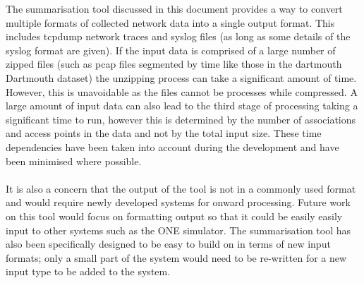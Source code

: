 The summarisation tool discussed in this document provides a way to convert multiple formats of collected network data into a single output format. This includes tcpdump network traces and syslog files (as long as some details of the syslog format are given).
If the input data is comprised of a large number of zipped files (such as pcap files segmented by time like those in the dartmouth Dartmouth dataset) the unzipping process can take a significant amount of time. However, this is unavoidable as the files cannot be processes while compressed. A large amount of input data can also lead to the third stage of processing taking a significant time to run, however this is determined by the number of associations and access points in the data and not by the total input size. These time dependencies have been taken into account during the development and have been minimised where possible.\\\\
It is also a concern that the output of the tool is not in a commonly used format and would require newly developed systems for onward processing. Future work on this tool would focus on formatting output so that it could be easily easily input to other systems such as the ONE simulator. The summarisation tool has also been specifically designed to be easy to build on in terms of new input formats; only a small part of the system would need to be re-written for a new input type to be added to the system.